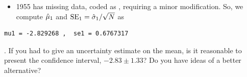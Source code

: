 \begin{frame}[fragile]

\begin{itemize}

\item 1955 has missing data, coded as , requiring a minor modification. So, we compute $\hat\mu_1$ and $\mathrm{SE}_1=\hat\sigma_1/\sqrt{N}$ as

\end{itemize}

\begin{knitrout}\small
{}\color{fgcolor}\begin{kframe}
\begin{alltt}
 \hlkwb{<-} \hlopt{$}\hlstd{=}\hlstd{)}
 \hlkwb{<-} \hlopt{$}\hlstd{=}\hlstd{)}\hlopt{/}\hlstd{(}\hlstd{(}\hlopt{!}\hlopt{$}
\hlstd{(}  \hlstd{)}
\end{alltt}
\begin{verbatim}
mu1 = -2.829268 ,  se1 = 0.6767317 
\end{verbatim}
\end{kframe}
\end{knitrout}

\myquestion. If you had to give an uncertainty estimate on the mean, is it reasonable to present the confidence interval, $-2.83 \pm 1.33$? Do you have ideas of a better alternative?

\answer{\vspace{2.5cm}}{}


\end{frame}


